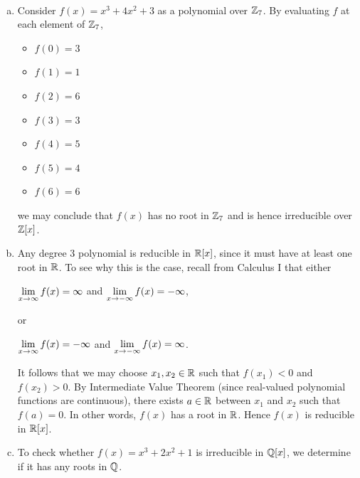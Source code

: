 \documentclass[11pt,fleqn,dvipsnames,usenames]{article}
\newcommand{\p}{\noindent}
\begin{document}
\begin{examples}\label{irreducibilityexamples}~
\begin{enumerate}[(a)]
\item Consider $f(x) = x^3 + 4x^2 + 3$ as a polynomial over $\mathbb{Z}_7$.  By evaluating $f$ at each element of $\mathbb{Z}_7$,
\begin{multicols}{4}
\begin{itemize}[\ ]
\item $f(0) = 3$
\item $f(1) = 1$
\item $f(2) = 6$
\item $f(3) = 3$
\item $f(4) = 5$
\item $f(5) = 4$
\item $f(6) = 6$
\end{itemize}
\end{multicols}
\p we may conclude that $f(x)$ has no root in $\mathbb{Z}_7$ and is hence irreducible over $\mathbb{Z}[x]$.
\item Any degree $3$ polynomial is reducible in $\mathbb{R}[x]$, since it must have at least one root in $\mathbb{R}$.  To see why this is the case, recall from Calculus I that either
\begin{center}
$\displaystyle\lim\limits_{x\to\infty}f(x) = \infty$ and $\displaystyle\lim\limits_{x\to-\infty}f(x) = -\infty$,
\end{center}
or
\begin{center}
$\displaystyle\lim\limits_{x\to\infty}f(x) = -\infty$ and $\displaystyle\lim\limits_{x\to-\infty}f(x) = \infty$.
\end{center}
It follows that we may choose $x_{1},x_{2}\in\mathbb{R}$ such that $f(x_{1}) < 0$ and $f(x_{2}) > 0$.  By Intermediate Value Theorem (since real-valued polynomial functions are continuous), there exists $a\in\mathbb{R}$ between $x_{1}$ and $x_{2}$ such that $f(a) = 0$.  In other words, $f(x)$ has a root in $\mathbb{R}$.  Hence $f(x)$ is reducible in $\mathbb{R}[x]$.
\item \label{ideabehindrationalroottest} To check whether $f(x) = x^3 + 2x^2 + 1$ is irreducible in $\mathbb{Q}[x]$, we determine if it has any roots in $\mathbb{Q}$.
\vsp


\end{enumerate}
\end{examples}
\end{document}
